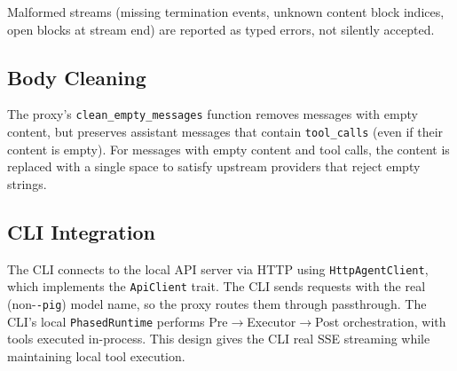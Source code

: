 Malformed streams (missing termination events, unknown content block indices, open blocks at stream end) are reported as typed errors, not silently accepted.

\subsection{Body Cleaning}

The proxy's \texttt{clean\_empty\_messages} function removes messages with empty content, but preserves assistant messages that contain \texttt{tool\_calls} (even if their content is empty). For messages with empty content and tool calls, the content is replaced with a single space to satisfy upstream providers that reject empty strings.

\subsection{CLI Integration}

The CLI connects to the local API server via HTTP using \texttt{HttpAgentClient}, which implements the \texttt{ApiClient} trait. The CLI sends requests with the real (non-\texttt{-pig}) model name, so the proxy routes them through passthrough. The CLI's local \texttt{PhasedRuntime} performs Pre$\rightarrow$Executor$\rightarrow$Post orchestration, with tools executed in-process. This design gives the CLI real SSE streaming while maintaining local tool execution.
